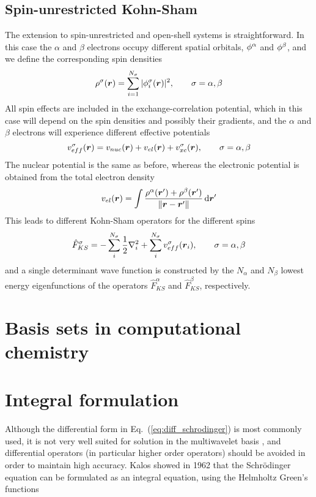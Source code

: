 \subsection{Spin-unrestricted Kohn-Sham}
The extension to spin-unrestricted and open-shell systems is straightforward. In this case the
$\alpha$ and $\beta$ electrons occupy different spatial orbitals, $\phi^\alpha$ and 
$\phi^\beta$, and we define the corresponding spin densities
\begin{equation}
    \rho^{\sigma}(\boldsymbol r) = 
	\sum_{i=1}^{N_{\sigma}} |\phi_i^{\sigma}(\boldsymbol r)|^2, \qquad \sigma = \alpha, \beta
\end{equation}
All spin effects are included in the exchange-correlation potential, which in this case will 
depend on the spin densities and possibly their gradients, and the $\alpha$ and $\beta$ electrons 
will experience different effective potentials
\begin{equation}
    v_{eff}^{\sigma} (\boldsymbol r) = 
	v_{nuc}(\boldsymbol r) + v_{el}(\boldsymbol r) + v_{xc}^{\sigma}(\boldsymbol r), \qquad \sigma = \alpha, \beta
\end{equation}
The nuclear potential is the same as before, whereas the electronic potential is obtained
from the total electron density
\begin{equation}
    v_{el}(\boldsymbol r) = \int \frac{\rho^\alpha(\boldsymbol r') + \rho^\beta(\boldsymbol r')}
	{\|\boldsymbol r-\boldsymbol r'\|} \,\mathrm{d} \boldsymbol r'
\end{equation}
This leads to different Kohn-Sham operators for the different spins
\begin{equation}
    \hat{F}_{KS}^\sigma = -\sum_i^{N_\sigma} \frac{1}{2}\nabla_i^2 + 
	\sum_i^{N_\sigma} v_{eff}^\sigma(\boldsymbol r_i), \qquad \sigma = \alpha, \beta
\end{equation}
and a single determinant wave function is constructed by the $N_\alpha$ and $N_\beta$ 
lowest energy eigenfunctions of the operators $\hat{F}_{KS}^\alpha$ and 
$\hat{F}_{KS}^\beta$, respectively.

\section{Basis sets in computational chemistry}

\section{Integral formulation}
Although the differential form in Eq.~(\ref{eq:diff_schrodinger}) is most 
commonly used, it is not very well suited for solution in the multiwavelet 
basis \cite{Harrison}, and differential operators (in particular higher 
order operators) should be avoided in order to maintain high accuracy. 
Kalos \cite{Kalos} showed in 1962 that the Schr\"{o}dinger equation can 
be formulated as an integral equation, using the Helmholtz Green's functions 

